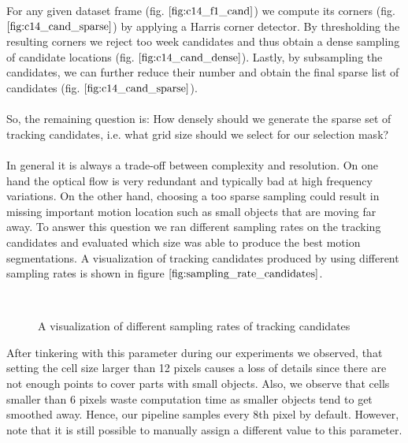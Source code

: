 For any given dataset frame (fig. $\ref{fig:c14_f1_cand}$) we compute its corners (fig. $\ref{fig:c14_cand_sparse}$) by applying a Harris corner detector. By thresholding the resulting corners we reject too week candidates and thus obtain a dense sampling of candidate locations (fig. $\ref{fig:c14_cand_dense}$). Lastly, by subsampling the candidates, we can further reduce their number and obtain the final sparse list of candidates (fig. $\ref{fig:c14_cand_sparse}$). \\ \\ 
So, the remaining question is: How densely should we generate the sparse set of tracking candidates, i.e. what grid size should we select for our selection mask? \\ \\
In general it is always a trade-off between complexity and resolution. On one hand the optical flow is very redundant and typically bad at high frequency variations. On the other hand, choosing a too sparse sampling could result in missing important motion location such as small objects that are moving far away. To answer this question we ran different sampling rates on the tracking candidates and evaluated which size was able to produce the best motion segmentations. A visualization of tracking candidates produced by using different sampling rates is shown in figure $\ref{fig:sampling_rate_candidates}$. 
\begin{figure}[H]
\begin{center}
~
\end{center}
\caption[Density Of Candidates For Different Sampling Rates]{A visualization of different sampling rates of tracking candidates}
\label{fig:sampling_rate_candidates}
\end{figure}
After tinkering with this parameter during our experiments we observed, that setting the cell size larger than 12 pixels causes a loss of details since there are not enough points to cover parts with small objects. Also, we observe that cells smaller than 6 pixels waste computation time as smaller objects tend to get smoothed away. Hence, our pipeline samples every 8th pixel by default. However, note that it is still possible to manually assign a different value to this parameter. \\ \\
